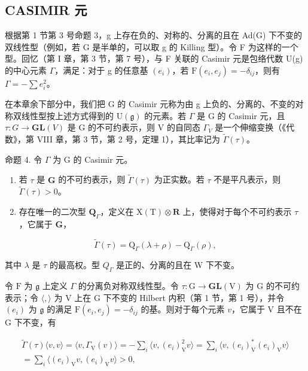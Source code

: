 \subsection{CASIMIR 元}

根据第 1 节第 3 号命题 3，g 上存在负的、对称的、分离的且在 Ad(G) 下不变的双线性型（例如，若 G 是半单的，可以取 g 的 Killing 型）。令 F 为这样的一个型。回忆（第 I 章，第 3 节，第 7 号），与 F 关联的 Casimir 元是包络代数 U(g) 的中心元素 \(\Gamma\)，满足：对于 g 的任意基 \((e_{i})\)，若 \(\mathrm{F}(e_{i}, e_{j}) = -\delta_{ij}\)，则有 \(\Gamma = -\sum e_{i}^{2}\)。

在本章余下部分中，我们把 G 的 Casimir 元称为由 g 上负的、分离的、不变的对称双线性型按上述方式得到的 \(\mathrm{U}(\mathfrak{g})\) 的元素。若 \(\Gamma\) 是 G 的 Casimir 元，且 \(\tau: G \to \mathbf{GL}(V)\) 是 G 的不可约表示，则 V 的自同态 \(\Gamma_{V}\) 是一个伸缩变换（《代数》，第 VIII 章，第 3 节，第 2 号，定理 1），其比率记为 \(\tilde{\Gamma}(\tau)\)。

命题 4. 令 \(\Gamma\) 为 G 的 Casimir 元。

\begin{enumerate}
\def\labelenumi{\alph{enumi})}
\item
  若 \(\tau\) 是 \(\mathbf{G}\) 的不可约表示，则 \(\tilde{\Gamma}(\tau)\) 为正实数。若 \(\tau\) 不是平凡表示，则 \(\tilde{\Gamma}(\tau) > 0\)。
\item
  存在唯一的二次型 \(\mathbf{Q}_{\Gamma}\)，定义在 \(\mathrm{X(T)}\otimes \mathbf{R}\) 上，使得对于每个不可约表示 \(\tau\)，它属于 \(\mathbf{G}\)，
\end{enumerate}

\[
\tilde {\Gamma} (\tau) = \mathrm{Q} _ {\Gamma} (\lambda + \rho) - \mathrm{Q} _ {\Gamma} (\rho),
\]

其中 \(\lambda\) 是 \(\tau\) 的最高权。型 \(Q_{\Gamma}\) 是正的、分离的且在 W 下不变。

令 \(\mathrm{F}\) 为 \(\mathfrak{g}\) 上定义 \(\Gamma\) 的分离负对称双线性型。令 \(\tau : \mathrm{G} \to \mathbf{GL}(\mathrm{V})\) 为 \(\mathrm{G}\) 的不可约表示；令 \(\langle , \rangle\) 为 \(\mathrm{V}\) 上在 \(\mathrm{G}\) 下不变的 Hilbert 内积（第 1 节，第 1 号），并令 \((e_i)\) 为 \(\mathfrak{g}\) 的满足 \(\mathrm{F}(e_i, e_j) = -\delta_{ij}\) 的基。则对于每个元素 \(v\)，它属于 \(\mathrm{V}\) 且不在 \(\mathrm{G}\) 下不变，有

\[
\begin{array}{c} \tilde {\Gamma} (\tau) \langle v, v \rangle = \langle v, \Gamma_ {\mathrm{V}} (v) \rangle = - \sum_ {i} \langle v, (e _ {i}) _ {\mathrm{V}} ^ {2} v \rangle = \sum_ {i} \langle v, (e _ {i}) _ {\mathrm{V}} ^ {*} (e _ {i}) _ {\mathrm{V}} v \rangle \\ = \sum_ {i} \langle (e _ {i}) _ {\mathrm{V}} v, (e _ {i}) _ {\mathrm{V}} v \rangle > 0, \end{array}
\]

